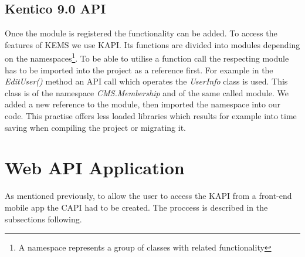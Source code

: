 \subsection{Kentico 9.0 API}
Once the module is registered the functionality can be added. To access the features of KEMS we use KAPI. Its functions are divided into modules depending on the namespaces\footnote{A namespace represents a group of classes with related functionality}. To be able to utilise a function call the respecting module has to be imported into the project as a reference first. For example in the \textit{EditUser()} method an API call which operates the \textit{UserInfo} class is used. This class is of the namespace \textit{CMS.Membership} and of the same called module. We added a new reference to the module, then imported the namespace into our code. This practise offers less loaded libraries which results for example into time saving when compiling the project or migrating it. 

\section{Web API Application}
As mentioned previously, to allow the user to access the KAPI from a front-end mobile app the CAPI had to be created. The proccess is described in the subsections following.
